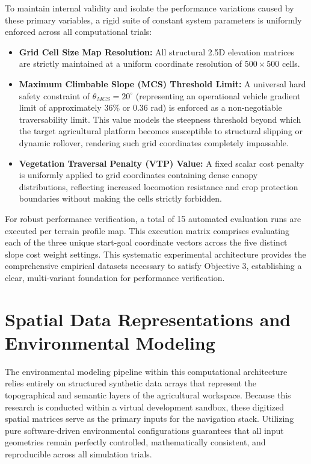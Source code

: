 To maintain internal validity and isolate the performance variations caused by these primary
variables, a rigid suite of constant system parameters is uniformly enforced across all
computational trials:

\begin{itemize}
    \item \textbf{Grid Cell Size Map Resolution:} All structural 2.5D elevation matrices are strictly maintained at a uniform coordinate resolution of $500 \times 500$ cells.

    \item \textbf{Maximum Climbable Slope (MCS) Threshold Limit:} A universal hard safety constraint of $\theta_{MCS} = 20^{\circ}$ (representing an operational vehicle gradient limit of approximately 36\% or 0.36 rad) is enforced as a non-negotiable traversability limit. This value models the steepness threshold beyond which the target agricultural platform becomes susceptible to structural slipping or dynamic rollover, rendering such grid coordinates completely impassable.

    \item \textbf{Vegetation Traversal Penalty (VTP) Value:} A fixed scalar cost penalty is uniformly applied to grid coordinates containing dense canopy distributions, reflecting increased locomotion resistance and crop protection boundaries without making the cells strictly forbidden.
\end{itemize}

For robust performance verification, a total of 15 automated evaluation runs are executed per
terrain profile map. This execution matrix comprises evaluating each of the three unique start-goal
coordinate vectors across the five distinct slope cost weight settings. This systematic experimental
architecture provides the comprehensive empirical datasets necessary to satisfy Objective 3,
establishing a clear, multi-variant foundation for performance verification.

\section{Spatial Data Representations and Environmental Modeling}

The environmental modeling pipeline within this computational architecture relies entirely on
structured synthetic data arrays that represent the topographical and semantic layers of the
agricultural workspace. Because this research is conducted within a virtual development sandbox,
these digitized spatial matrices serve as the primary inputs for the navigation stack. Utilizing
pure software-driven environmental configurations guarantees that all input geometries remain
perfectly controlled, mathematically consistent, and reproducible across all simulation trials.

